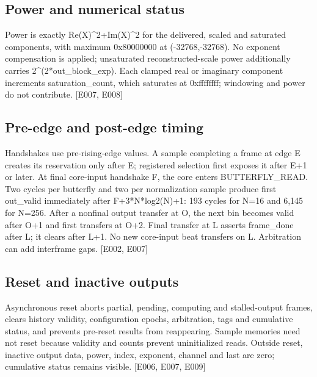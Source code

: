 \documentclass[11pt,a4paper]{article}
\begin{document}
\subsection{Power and numerical status}

Power is exactly Re(\allowbreak{}X)\allowbreak{}\textasciicircum{}2+\allowbreak{}Im(\allowbreak{}X)\allowbreak{}\textasciicircum{}2 for the delivered,\allowbreak{} scaled and saturated components,\allowbreak{} with maximum 0x80000000 at (\allowbreak{}-32768,\allowbreak{}-32768)\allowbreak{}. No exponent compensation is applied; unsaturated reconstructed-scale power additionally carries 2\textasciicircum{}(\allowbreak{}2*\allowbreak{}out\_\allowbreak{}block\_\allowbreak{}exp)\allowbreak{}. Each clamped real or imaginary component increments saturation\_\allowbreak{}count,\allowbreak{} which saturates at 0xffffffff; windowing and power do not contribute. [\allowbreak{}E007,\allowbreak{} E008]\allowbreak{}

\subsection{Pre-edge and post-edge timing}

Handshakes use pre-rising-edge values. A sample completing a frame at edge E creates its reservation only after E; registered selection first exposes it after E+\allowbreak{}1 or later. At final core-input handshake F,\allowbreak{} the core enters BUTTERFLY\_\allowbreak{}READ. Two cycles per butterfly and two per normalization sample produce first out\_\allowbreak{}valid immediately after F+\allowbreak{}3*\allowbreak{}N*\allowbreak{}log2(\allowbreak{}N)\allowbreak{}+\allowbreak{}1: 193 cycles for N=\allowbreak{}16 and 6,\allowbreak{}145 for N=\allowbreak{}256. After a nonfinal output transfer at O,\allowbreak{} the next bin becomes valid after O+\allowbreak{}1 and first transfers at O+\allowbreak{}2. Final transfer at L asserts frame\_\allowbreak{}done after L; it clears after L+\allowbreak{}1. No new core-input beat transfers on L. Arbitration can add interframe gaps. [\allowbreak{}E002,\allowbreak{} E007]\allowbreak{}

\subsection{Reset and inactive outputs}

Asynchronous reset aborts partial,\allowbreak{} pending,\allowbreak{} computing and stalled-output frames,\allowbreak{} clears history validity,\allowbreak{} configuration epochs,\allowbreak{} arbitration,\allowbreak{} tags and cumulative status,\allowbreak{} and prevents pre-reset results from reappearing. Sample memories need not reset because validity and counts prevent uninitialized reads. Outside reset,\allowbreak{} inactive output data,\allowbreak{} power,\allowbreak{} index,\allowbreak{} exponent,\allowbreak{} channel and last are zero; cumulative status remains visible. [\allowbreak{}E006,\allowbreak{} E007,\allowbreak{} E009]\allowbreak{}
\end{document}
